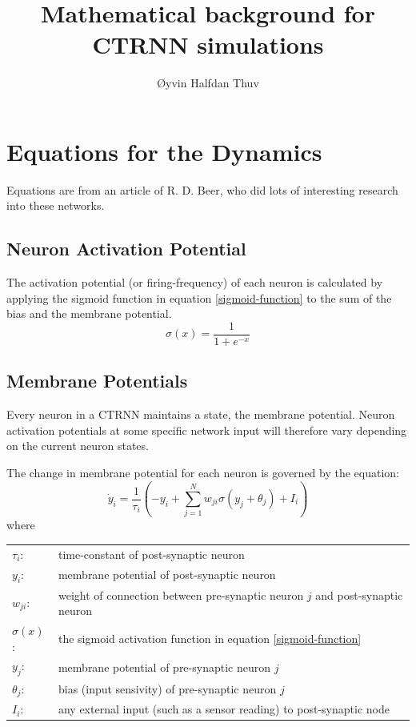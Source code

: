 \documentclass[a4paper]{article}
\title{Mathematical background for CTRNN simulations}
\author{Øyvin Halfdan Thuv}
\begin{document}
\maketitle

\section{Equations for the Dynamics}
Equations are from an article\cite{beer-1995} of R. D. Beer, who did lots of interesting research into these networks.

\subsection{Neuron Activation Potential}
The activation potential (or firing-frequency) of each neuron is calculated by applying the sigmoid function in equation \ref{sigmoid-function} to the sum of the bias and the membrane potential.
\begin{equation}
  \label{sigmoid-function}
  \sigma(x) = \frac{1}{1 + e^{-x}}
\end{equation}

\subsection{Membrane Potentials}
Every neuron in a CTRNN maintains a state, the membrane potential. Neuron activation potentials at some specific network input will therefore vary depending on the current neuron states.

The change in membrane potential for each neuron is governed by the equation:
\begin{equation}
  \label{membrane-potential-equation}
  \dot{y}_i = \frac{1}{\tau_i}(-y_i + \sum_{j=1}^{N}w_{ji}\sigma(y_j + \theta_j) + I_i)
\end{equation}
\vspace{1em}
where\\
\begin{tabular}{ll}
  $\tau_i$: & time-constant of post-synaptic neuron\\
  $y_i$: & membrane potential of post-synaptic neuron\\
  $w_{ji}$: & weight of connection between pre-synaptic neuron $j$ and post-synaptic neuron\\
  $\sigma(x)$: & the sigmoid activation function in equation \ref{sigmoid-function}\\
  $y_j$: & membrane potential of pre-synaptic neuron $j$\\
  $\theta_j$: & bias (input sensivity) of pre-synaptic neuron $j$\\
  $I_i$: & any external input (such as a sensor reading) to post-synaptic node\\
\end{tabular}\par
\end{document}
